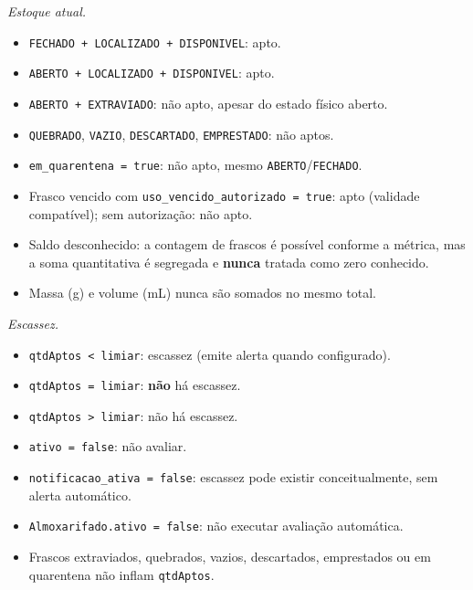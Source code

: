 \emph{Estoque atual.}
\begin{itemize}
    \item \texttt{FECHADO + LOCALIZADO + DISPONIVEL}: apto.
    \item \texttt{ABERTO + LOCALIZADO + DISPONIVEL}: apto.
    \item \texttt{ABERTO + EXTRAVIADO}: não apto, apesar do estado físico aberto.
    \item \texttt{QUEBRADO}, \texttt{VAZIO}, \texttt{DESCARTADO}, \texttt{EMPRESTADO}: não aptos.
    \item \texttt{em\_quarentena = true}: não apto, mesmo \texttt{ABERTO}/\texttt{FECHADO}.
    \item Frasco vencido com \texttt{uso\_vencido\_autorizado = true}: apto (validade compatível); sem autorização: não apto.
    \item Saldo desconhecido: a contagem de frascos é possível conforme a métrica, mas a soma quantitativa é segregada e \textbf{nunca} tratada como zero conhecido.
    \item Massa (g) e volume (mL) nunca são somados no mesmo total.
\end{itemize}

\emph{Escassez.}
\begin{itemize}
    \item \texttt{qtdAptos < limiar}: escassez (emite alerta quando configurado).
    \item \texttt{qtdAptos = limiar}: \textbf{não} há escassez.
    \item \texttt{qtdAptos > limiar}: não há escassez.
    \item \texttt{ativo = false}: não avaliar.
    \item \texttt{notificacao\_ativa = false}: escassez pode existir conceitualmente, sem alerta automático.
    \item \texttt{Almoxarifado.ativo = false}: não executar avaliação automática.
    \item Frascos extraviados, quebrados, vazios, descartados, emprestados ou em quarentena não inflam \texttt{qtdAptos}.
\end{itemize}

